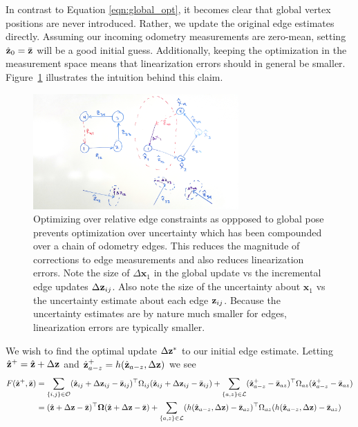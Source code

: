 In contrast to Equation \ref*{eqn:global_opt}, it becomes clear that global vertex positions are never introduced. Rather, we update the original edge estimates directly. Assuming our incoming odometry measurements are zero-mean, setting $\hat{\mathbf{z}}_0 = \bar{\mathbf{z}}$ will be a good initial guess.  Additionally, keeping the optimization in the measurement space means that linearization errors should in general be smaller.  Figure~\ref{fig:linearization} illustrates the intuition behind this claim.

\begin{figure}
  \includegraphics[width=0.7\textwidth]{figures/linearization.jpg}
  \caption{Optimizing over relative edge constraints as oppposed to global pose prevents optimization over uncertainty which has been compounded over a chain of odometry edges.  This reduces the magnitude of corrections to edge measurements and also reduces linearization errors.  Note the size of $\Delta\textbf{x}_1$ in the global update vs the incremental edge updates $\Delta \mathbf{z}_{ij}$.  Also note the size of the uncertainty about $\textbf{x}_1$ vs the uncertainty estimate about each edge $\mathbf{z}_{ij}$.  Because the uncertainty estimates are by nature much smaller for edges, linearization errors are typically smaller.}
  \label{fig:linearization}
\end{figure}

We wish to find the optimal update $\Delta\mathbf{z}^*$ to our initial edge estimate. Letting $\hat{\mathbf{z}}^+ = \hat{\mathbf{z}} + \Delta\mathbf{z}$ and $\hat{\mathbf{z}}_{a-z}^+ = h(\hat{\mathbf{z}}_{a-z},\Delta\mathbf{z})$ we see
\begin{align*}
  F(\hat{\mathbf{z}}^+,\bar{\mathbf{z}}) &= \sum_{\{i,j\} \in \mathcal{O}} (\hat{\mathbf{z}}_{ij} + \Delta\mathbf{z}_{ij}-\bar{\mathbf{z}}_{ij})^\top\Omega_{ij}(\hat{\mathbf{z}}_{ij} + \Delta\mathbf{z}_{ij}-\bar{\mathbf{z}}_{ij}) + \sum_{\{a,z\} \in \mathcal{L}} (\hat{\mathbf{z}}_{a-z}^+-\bar{\mathbf{z}}_{az})^\top\Omega_{az}(\hat{\mathbf{z}}_{a-z}^+-\bar{\mathbf{z}}_{az}) \\
  &= (\hat{\mathbf{z}}+\Delta\mathbf{z}-\bar{\mathbf{z}})^\top\boldsymbol{\Omega}(\hat{\mathbf{z}}+\Delta\mathbf{z}-\bar{\mathbf{z}}) + \sum_{\{a,z\} \in \mathcal{L}} (h(\hat{\mathbf{z}}_{a-z},\Delta\mathbf{z})-\bar{\mathbf{z}}_{az})^\top\Omega_{az}(h(\hat{\mathbf{z}}_{a-z},\Delta\mathbf{z})-\bar{\mathbf{z}}_{az})
\end{align*}

